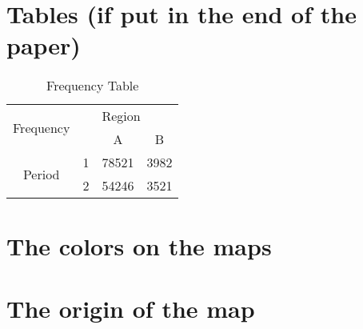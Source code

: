 \section*{Tables (if put in the end of the paper)}

\begin{table}[h!]
    \centering
    \begin{tabular}{cccc}
\hline \hline
\multirow{2}{*}{Frequency} &   & \multicolumn{2}{l}{Region}       \\
                           &   & A           & B                  \\
\hline                           
\multirow{2}{*}{Period}    & 1 & 78521          & 3982            \\
                           & 2 & 54246          & 3521            \\
\hline \hline
    \end{tabular}
    \caption{Frequency Table}
    \label{paper1_table_frequency}
\end{table}  



\pagebreak
\begin{subappendices}

\section{The colors on the maps}
\lipsum[10-10]

\section{{The origin of the map}}
\lipsum[11-11]


\end{subappendices}